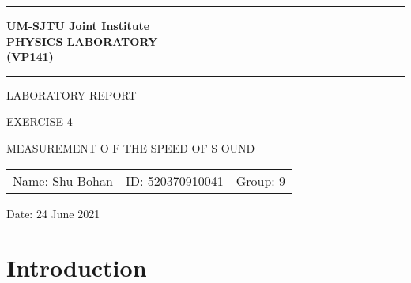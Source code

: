 \documentclass[12pt, a4paper]{article}
\begin{document}
\pagestyle{plain}

\begin{titlepage}

	\begin{center}	

	\vspace{10ex}

	\hrule

	\vspace{2ex}

	\textbf{\Large{UM-SJTU} \Large{J}\large{oint} \Large{I}\large{nstitute} \\
	\Large{P}\large{HYSICS} \Large{L}\large{ABORATORY} \\
	\large{(}\Large{V}\large{P141)}}\\
	
	\vspace{2ex}

	\hrule
	
	\vspace{25ex}
	
	\Large{L}\large{ABORATORY} \Large{R}\large{EPORT}

	\vspace{6ex}

	\large{E}\normalsize{XERCISE 4}

	\vspace{4ex}

	\large M\normalsize EASUREMENT \normalsize O F \large T\normalsize HE \large S\normalsize PEED \normalsize OF \large S \normalsize OUND  

	\vspace{4ex}

	\begin{center}
		\begin{tabular}{lll}
		Name: Shu Bohan & ID: 520370910041 & Group: 9
		\end{tabular}
	\end{center}

	{\large Date: 24 June 2021}
	
	\end{center}
	
\end{titlepage}

\newpage


\section{Introduction}
\end{document}
